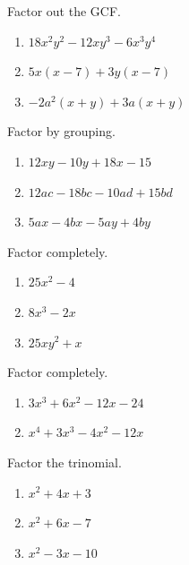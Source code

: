 \documentclass[en,12pt]{elegantbook}
\providecommand{\tightlist}{%
  \setlength{\itemsep}{0pt}\setlength{\parskip}{0pt}}
\let\BeginKnitrBlock\begin \let\EndKnitrBlock\end
\begin{document}
\BeginKnitrBlock{exercise}
\protect\hypertarget{exr:unnamed-chunk-32}{}{\label{exr:unnamed-chunk-32} }
Factor out the GCF.

\begin{enumerate}
\def\labelenumi{\arabic{enumi}.}
\tightlist
\item
  \(18x^2y^2-12xy^3-6x^3y^4\)
\item
  \(5x(x-7)+3y(x-7)\)
\item
  \(-2a^2(x+y)+3a(x+y)\)
\end{enumerate}
\EndKnitrBlock{exercise}

\BeginKnitrBlock{exercise}
\protect\hypertarget{exr:unnamed-chunk-33}{}{\label{exr:unnamed-chunk-33} }
Factor by grouping.

\begin{enumerate}
\def\labelenumi{\arabic{enumi}.}
\tightlist
\item
  \(12xy-10y+18x-15\)
\item
  \(12ac-18bc-10ad+15bd\)
\item
  \(5ax-4bx-5ay+4by\)
\end{enumerate}
\EndKnitrBlock{exercise}

\BeginKnitrBlock{exercise}
\protect\hypertarget{exr:unnamed-chunk-34}{}{\label{exr:unnamed-chunk-34} }
Factor completely.

\begin{enumerate}
\def\labelenumi{\arabic{enumi}.}
\tightlist
\item
  \(25x^2-4\)
\item
  \(8x^3-2x\)
\item
  \(25xy^2+x\)
\end{enumerate}
\EndKnitrBlock{exercise}

\BeginKnitrBlock{exercise}
\protect\hypertarget{exr:unnamed-chunk-35}{}{\label{exr:unnamed-chunk-35} }
Factor completely.

\begin{enumerate}
\def\labelenumi{\arabic{enumi}.}
\tightlist
\item
  \(3x^3+6x^2-12x-24\)
\item
  \(x^4+3x^3-4x^2-12x\)
\end{enumerate}
\EndKnitrBlock{exercise}

\BeginKnitrBlock{exercise}
\protect\hypertarget{exr:unnamed-chunk-36}{}{\label{exr:unnamed-chunk-36} }
Factor the trinomial.

\begin{enumerate}
\def\labelenumi{\arabic{enumi}.}
\tightlist
\item
  \(x^2+4x+3\)
\item
  \(x^2+6x-7\)
\item
  \(x^2-3x-10\)
\end{enumerate}
\EndKnitrBlock{exercise}
\end{document}
